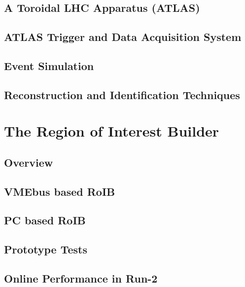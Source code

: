 \documentclass{outhesis}
\begin{document}
\section{A Toroidal LHC Apparatus (ATLAS)}\label{sec:exp.atlas}

\section{ATLAS Trigger and Data Acquisition System}\label{sec:exp.tdaq}

\section{Event Simulation}\label{sec:exp.sim}

\section{Reconstruction and Identification Techniques}\label{sec:exp.reco}


\chapter{The Region of Interest Builder}\label{chap:roib}
\graphicspath{{figures/roib/}}
\section{Overview}\label{sec:roib.overview}

\section{VMEbus based RoIB}\label{sec:roib.overview}

\section{PC based RoIB}\label{sec:roib.pc}

\section{Prototype Tests}\label{sec:roib.proto}

\section{Online Performance in Run-2}\label{sec:roib.perf}

\end{document}
